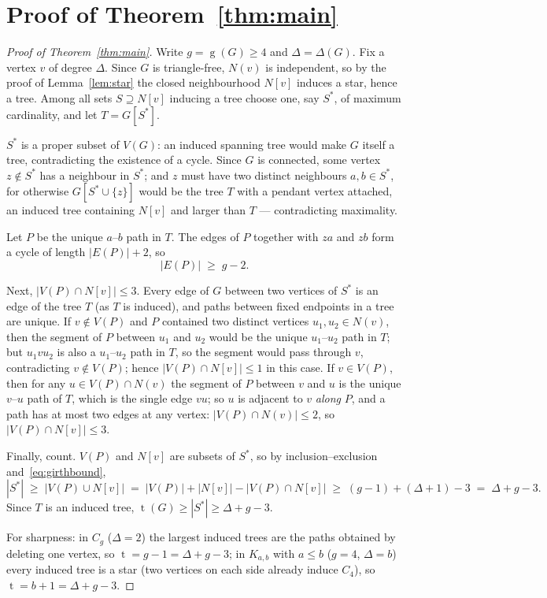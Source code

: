 \documentclass[11pt]{article}
\numberwithin{equation}{section}
\theoremstyle{remark}
\newcommand{\tr}{\operatorname{t}}
\newcommand{\gr}{\operatorname{g}}
\begin{document}
\section{Proof of Theorem~\texorpdfstring{\ref{thm:main}}{1.1}}

\begin{proof}[Proof of Theorem~\ref{thm:main}]
Write $g=\gr(G)\ge4$ and $\Delta=\Delta(G)$.  Fix a vertex $v$ of degree
$\Delta$.  Since $G$ is triangle-free, $N(v)$ is independent, so by the proof
of Lemma~\ref{lem:star} the closed neighbourhood $N[v]$ induces a star, hence
a tree.  Among all sets $S\supseteq N[v]$ inducing a tree choose one, say
$S^*$, of maximum cardinality, and let $T=G[S^*]$.

$S^*$ is a proper subset of $V(G)$: an induced spanning tree would make $G$
itself a tree, contradicting the existence of a cycle.  Since $G$ is
connected, some vertex $z\notin S^*$ has a neighbour in $S^*$; and $z$ must
have two distinct neighbours $a,b\in S^*$, for otherwise $G[S^*\cup\{z\}]$
would be the tree $T$ with a pendant vertex attached, an induced tree
containing $N[v]$ and larger than $T$ --- contradicting maximality.

Let $P$ be the unique $a$--$b$ path in $T$.  The edges of $P$ together with
$za$ and $zb$ form a cycle of length $|E(P)|+2$, so
\begin{equation}\label{eq:girthbound}
  |E(P)|\;\ge\;g-2 .
\end{equation}

Next, $|V(P)\cap N[v]|\le 3$.  Every edge of $G$ between two vertices of
$S^*$ is an edge of the tree $T$ (as $T$ is induced), and paths between fixed
endpoints in a tree are unique.  If $v\notin V(P)$ and $P$ contained two
distinct vertices $u_1,u_2\in N(v)$, then the segment of $P$ between $u_1$
and $u_2$ would be the unique $u_1$--$u_2$ path in $T$; but $u_1vu_2$ is also
a $u_1$--$u_2$ path in $T$, so the segment would pass through $v$,
contradicting $v\notin V(P)$; hence $|V(P)\cap N[v]|\le1$ in this case.  If
$v\in V(P)$, then for any $u\in V(P)\cap N(v)$ the segment of $P$ between $v$
and $u$ is the unique $v$--$u$ path of $T$, which is the single edge $vu$;
so $u$ is adjacent to $v$ \emph{along} $P$, and a path has at most two edges
at any vertex: $|V(P)\cap N(v)|\le2$, so $|V(P)\cap N[v]|\le3$.

Finally, count.  $V(P)$ and $N[v]$ are subsets of $S^*$, so by
inclusion--exclusion and~\eqref{eq:girthbound},
\[
  |S^*|\;\ge\;|V(P)\cup N[v]|\;=\;|V(P)|+|N[v]|-|V(P)\cap N[v]|
  \;\ge\;(g-1)+(\Delta+1)-3\;=\;\Delta+g-3 .
\]
Since $T$ is an induced tree, $\tr(G)\ge|S^*|\ge\Delta+g-3$.

For sharpness: in $C_g$ ($\Delta=2$) the largest induced trees are the paths
obtained by deleting one vertex, so $\tr=g-1=\Delta+g-3$; in $K_{a,b}$ with
$a\le b$ ($g=4$, $\Delta=b$) every induced tree is a star (two vertices on
each side already induce $C_4$), so $\tr=b+1=\Delta+g-3$.
\end{proof}
\end{document}
